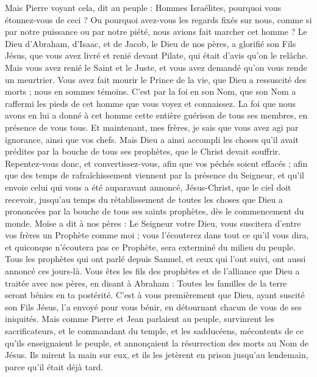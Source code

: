 \begin{multicols}{2}
Mais Pierre voyant cela, dit au peuple : Hommes Israélites, pourquoi vous étonnez-vous de ceci ? Ou pourquoi avez-vous les regards fixés sur nous, comme si par notre puissance ou par notre piété, nous avions fait marcher cet homme ?
Le Dieu d'Abraham, d'Isaac, et de Jacob, le Dieu de nos pères, a glorifié son Fils Jésus, que vous avez livré et renié devant Pilate, qui était d’avis qu’on le relâche.
Mais vous avez renié le Saint et le Juste, et vous avez demandé qu'on vous rende un meurtrier.
Vous avez fait mourir le Prince de la vie, que Dieu a ressuscité des morts ; nous en sommes témoins.
C’est par la foi en son Nom, que son Nom a raffermi les pieds de cet homme que vous voyez et connaissez. La foi que nous avons en lui a donné à cet homme cette entière guérison de tous ses membres, en présence de vous tous.
Et maintenant, mes frères, je sais que vous avez agi par ignorance, ainsi que vos chefs.
Mais Dieu a ainsi accompli les choses qu'il avait prédites par la bouche de tous ses prophètes, que le Christ devait souffrir.
Repentez-vous donc, et convertissez-vous, afin que vos péchés soient effacés ;
afin que des temps de rafraîchissement viennent par la présence du Seigneur, et qu'il envoie celui qui vous a été auparavant annoncé, Jésus-Christ,
que le ciel doit recevoir, jusqu'au temps du rétablissement de toutes les choses que Dieu a prononcées par la bouche de tous ses saints prophètes, dès le commencement du monde.
Moïse a dit à nos pères : Le Seigneur votre Dieu, vous suscitera d'entre vos frères un Prophète comme moi ; vous l'écouterez dans tout ce qu'il vous dira,
et quiconque n’écoutera pas ce Prophète, sera exterminé du milieu du peuple.
Tous les prophètes qui ont parlé depuis Samuel, et ceux qui l'ont suivi, ont aussi annoncé ces jours-là.
Vous êtes les fils des prophètes et de l'alliance que Dieu a traitée avec nos pères, en disant à Abraham : Toutes les familles de la terre seront bénies en ta postérité.
C'est à vous premièrement que Dieu, ayant suscité son Fils Jésus, l'a envoyé pour vous bénir, en détournant chacun de vous de ses iniquités.
\VerseOne{}Mais comme Pierre et Jean parlaient au peuple, survinrent les sacrificateurs, et le commandant du temple, et les sadducéens,
mécontents de ce qu'ils enseignaient le peuple, et annonçaient la résurrection des morts au Nom de Jésus.
Ils mirent la main sur eux, et ils les jetèrent en prison jusqu'au lendemain, parce qu'il était déjà tard.

\end{multicols}
